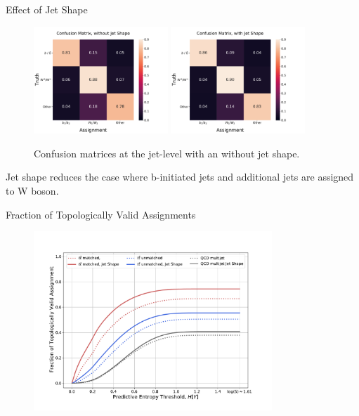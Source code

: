 \documentclass[10pt]{beamer}
\begin{document}
\begin{frame}[fragile]{Effect of Jet Shape}
    \begin{figure}
        \centering
        \includegraphics[width=0.45\textwidth]{figures/confusion-matrix/confusion_matrix_without_jet_shape.pdf}
        \includegraphics[width=0.45\textwidth]{figures/confusion-matrix/confusion_matrix_with_jet_shape.pdf}
        \caption{Confusion matrices at the jet-level with an without jet shape.}
    \end{figure}
    Jet shape reduces the case where b-initiated jets and additional jets are assigned to W boson.
\end{frame}

\begin{frame}[fragile]{Fraction of Topologically Valid Assignments}
    \begin{figure}
        \centering
        \includegraphics[width=0.8\textwidth]{figures/misc/frac_topo_valid.pdf}
    \end{figure}
\end{frame}
\end{document}
